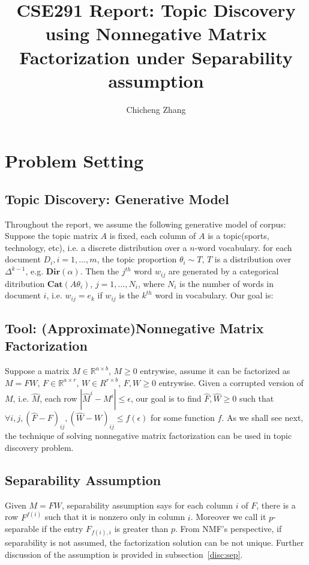 \documentclass{article}
\title{CSE291 Report: Topic Discovery using Nonnegative Matrix Factorization under Separability assumption}
\author{Chicheng Zhang}
\def\R{\mathbb{R}}
\def\Cat{\mathbf{Cat}}
\def\Dir{\mathbf{Dir}}
\begin{document}
\maketitle

\section{Problem Setting}
\subsection{Topic Discovery: Generative Model}
Throughout the report, we assume the following generative model of corpus: Suppose the topic matrix $A$ is fixed, each column of $A$ is a topic(sports, technology, etc), i.e. a discrete distribution over a $n$-word vocabulary. for each document $D_i, i = 1, \ldots, m$, the topic proportion $\theta_i \sim T$, $T$ is a distribution over $\Delta^{k-1}$, e.g. $\Dir(\alpha)$. Then the $j^{th}$ word $w_{ij}$ are generated by a categorical ditribution $\Cat(A\theta_i)$, $j = 1 ,\ldots, N_i$, where $N_i$ is the number of words in document $i$, i.e. $w_{ij} = e_k$ if $w_{ij}$ is the $k^{th}$ word in vocabulary. Our goal is:



\subsection{Tool: (Approximate)Nonnegative Matrix Factorization}
\label{tool:nmf}
Suppose a matrix $M \in \R^{a \times b}$, $M \ge 0$ entrywise, assume it can be factorized as $M = FW$, $F \in \R^{a \times r}$, $W \in R^{r \times b}$, $F,W \ge 0$ entrywise. Given a corrupted version of $M$, i.e. $\hat{M}$, each row $|\hat{M}^i - M^i| \le \epsilon$, our goal is to find $\hat{F},\hat{W} \ge 0$ such that $\forall i,j, (\hat{F} - F)_{ij}, (\hat{W} - W)_{ij} \le f(\epsilon)$ for some function $f$. As we shall see next, the technique of solving nonnegative matrix factorization can be used in topic discovery problem.

\subsection{Separability Assumption}
Given $M = FW$, separability assumption says for each column $i$ of $F$, there is a row $F^{f(i)}$ such that it is nonzero only in column $i$. Moreover we call it $p$-separable if the entry $F_{f(i),i}$ is greater than $p$. From NMF's perspective, if separability is not assumed, the factorization solution can be not unique. Further discussion of the assumption is provided in subsection~\ref{disc:sep}.
\end{document}

